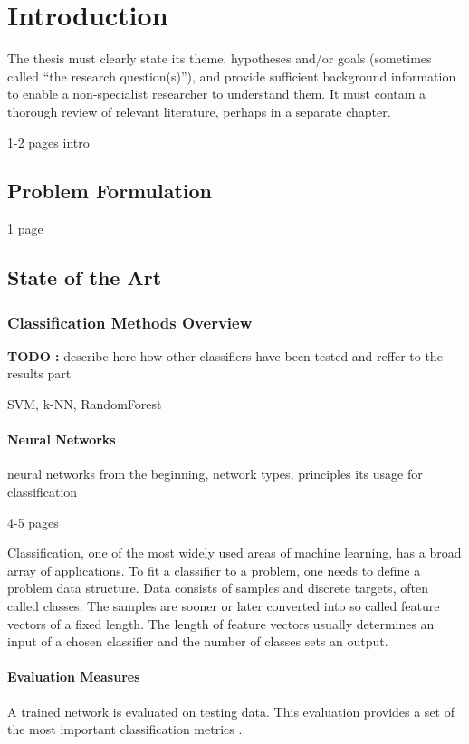 \chapter{Introduction} \label{chapter:01:introduction}

The thesis must clearly state its theme, hypotheses and/or goals (sometimes called “the research question(s)”), and provide sufficient background information to enable a non-specialist researcher to understand them. It must contain a thorough review of relevant literature, perhaps in a separate chapter.

1-2 pages intro

\newpage
\section{Problem Formulation}
1 page

\newpage
\section{State of the Art} \label{sec:soa}

\subsection{Classification Methods Overview} \label{sec:soa_other_classifiers}
\textbf{TODO :} describe here how other classifiers have been tested and reffer to the results part

SVM, k-NN, RandomForest

\subsubsection*{Neural Networks} \label{ssec:intro_to_nn}

neural networks from the beginning, network types, principles its usage for classification

4-5 pages

Classification, one of the most widely used areas of machine learning, has a broad array of applications. To fit a classifier to a problem, one needs to define a problem data structure. Data consists of samples and discrete targets, often called classes. The samples are sooner or later converted into so called feature vectors of a fixed length. The length of feature vectors usually determines an input of a chosen classifier and the number of classes sets an output.

\subsubsection*{Evaluation Measures} \label{ssec:evaluation_measures}
A trained network is evaluated on testing data. This evaluation provides a set of the most important classification metrics \citep{article:scikit-learn}.

